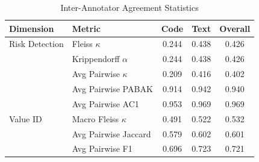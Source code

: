 \begin{table}[htbp]
\centering
\caption{Inter-Annotator Agreement Statistics}
\label{tab:iaa-overall}
\begin{tabular}{l l c c c}
\toprule
Dimension & Metric & Code & Text & Overall \\
\midrule
Risk Detection & Fleiss $\kappa$ & 0.244 & 0.438 & 0.426 \\
 & Krippendorff $\alpha$ & 0.244 & 0.438 & 0.426 \\
 & Avg Pairwise $\kappa$ & 0.209 & 0.416 & 0.402 \\
 & Avg Pairwise PABAK & 0.914 & 0.942 & 0.940 \\
 & Avg Pairwise AC1 & 0.953 & 0.969 & 0.969 \\
\midrule
Value ID & Macro Fleiss $\kappa$ & 0.491 & 0.522 & 0.532 \\
 & Avg Pairwise Jaccard & 0.579 & 0.602 & 0.601 \\
 & Avg Pairwise F1 & 0.696 & 0.723 & 0.721 \\
\bottomrule
\end{tabular}
\end{table}


